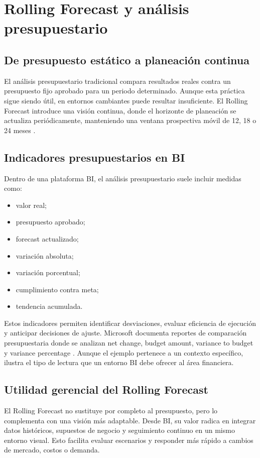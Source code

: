 \documentclass[12pt]{article}
\begin{document}
\section{Rolling Forecast y análisis presupuestario}
\subsection{De presupuesto estático a planeación continua}
El análisis presupuestario tradicional compara resultados reales contra un presupuesto fijo aprobado para un periodo determinado. Aunque esta práctica sigue siendo útil, en entornos cambiantes puede resultar insuficiente. El Rolling Forecast introduce una visión continua, donde el horizonte de planeación se actualiza periódicamente, manteniendo una ventana prospectiva móvil de 12, 18 o 24 meses \cite{oracle_rolling_forecast}.

\subsection{Indicadores presupuestarios en BI}
Dentro de una plataforma BI, el análisis presupuestario suele incluir medidas como:
\begin{itemize}[leftmargin=*]
\item valor real;
\item presupuesto aprobado;
\item forecast actualizado;
\item variación absoluta;
\item variación porcentual;
\item cumplimiento contra meta;
\item tendencia acumulada.
\end{itemize}

Estos indicadores permiten identificar desviaciones, evaluar eficiencia de ejecución y anticipar decisiones de ajuste. Microsoft documenta reportes de comparación presupuestaria donde se analizan net change, budget amount, variance to budget y variance percentage \cite{ms_budget_comparison}. Aunque el ejemplo pertenece a un contexto específico, ilustra el tipo de lectura que un entorno BI debe ofrecer al área financiera.

\subsection{Utilidad gerencial del Rolling Forecast}
El Rolling Forecast no sustituye por completo al presupuesto, pero lo complementa con una visión más adaptable. Desde BI, su valor radica en integrar datos históricos, supuestos de negocio y seguimiento continuo en un mismo entorno visual. Esto facilita evaluar escenarios y responder más rápido a cambios de mercado, costos o demanda.
\end{document}
